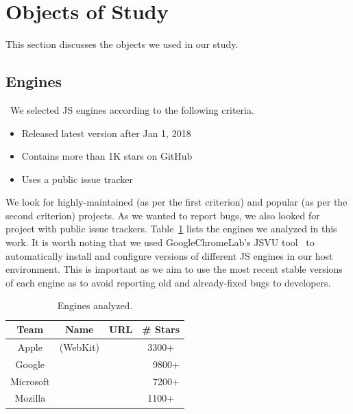 \documentclass[10pt,conference,anonymous]{IEEEtran}
\begin{document}
\section{Objects of Study}
\label{sec:methodology}

This section discusses the objects we used in our study.

\subsection{Engines}
\label{sec:methodology:engines}~We selected 
JS engines according to the following criteria.

\begin{itemize}
\item Released latest version after Jan 1, 2018
\item Contains more than 1K stars on GitHub  
\item Uses a public issue tracker
\end{itemize}  

We look for highly-maintained (as per the first criterion) and popular
(as per the second criterion) projects. As we wanted to report bugs,
we also looked for project with public issue
trackers. Table~\ref{tab:engines} lists the engines we analyzed in
this work. It is worth noting that we used GoogleChromeLab's JSVU
tool~\cite{jsvu} to automatically install and configure versions of
different JS engines in our host environment. This is important as we
aim to use the most recent stable versions of each engine as to avoid
reporting old and already-fixed bugs to developers.


\begin{table}[t]
  \centering
  \caption{\label{tab:engines}Engines analyzed.}
  \begin{tabular}{cccr}
    \toprule
    Team & Name & URL & \# Stars \\
    \midrule
    Apple & \jsc{} (WebKit) & \cite{jsc2018repo} & \multicolumn{1}{c}{3300+} \\
    Google & \veight{} & \cite{v82018repo} & 9800+ \\
    Microsoft & \chakra{} & \cite{chakra2018repo} & 7200+ \\
    Mozilla & \smonkey{} & \cite{spidermonkey2018repo} & \multicolumn{1}{c}{1100+} \\
   \bottomrule     
  \end{tabular}
\end{table}
\end{document}
